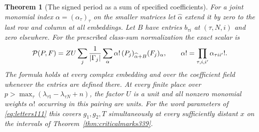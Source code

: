 \documentclass[a4paper,11pt]{article}
\newtheorem{theorem}[proposition]{Theorem}
\theoremstyle{definition}
\theoremstyle{remark}
\numberwithin{equation}{section}
\begin{document}
\begin{theorem}[The signed period as a sum of specified coefficients]\leavevmode
\label{thm:terminalformula347}
For a joint monomial index \(\alpha=(\alpha_\tau)_\tau\) on the
smaller matrices let \(\widehat\alpha\) extend it by zero to
the last row and column at all embeddings. Let \(B\) have entries
\(b_{\tau i}\) at \((\tau,N,i)\) and zero elsewhere. For the
prescribed class-sum normalization the exact scalar is
\[
 {\cal P}(P,F)=ZU\sum_j\frac{1}{|\Gamma_j|}
          \sum_\alpha \alpha!\,(P_j)_{\widehat\alpha+B}(F_j)_\alpha ,
 \qquad \alpha!=\prod_{\tau,i,i'}\alpha_{\tau ii'}! .
\]
The formula holds at every complex embedding and over the coefficient
field whenever the entries are defined there. At every finite place
over \(p>\max_\tau(\lambda_{\tau1}-\lambda_{\tau N}+n)\), the
factor \(U\) is a unit and all nonzero monomial weights \(\alpha!\)
occurring in this pairing are units. For the word parameters
of \eqref{eq:letters111} this covers \(g_1,g_2,T\) simultaneously
at every sufficiently distant \(x\) on the intervals of
Theorem~\ref{thm:criticalmarks339}.
\end{theorem}
\end{document}
